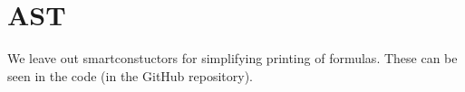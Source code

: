 \section{AST}\label{sec:ast}
We leave out smartconstuctors for simplifying printing of formulas. These can be seen in the code (in the GitHub repository).

